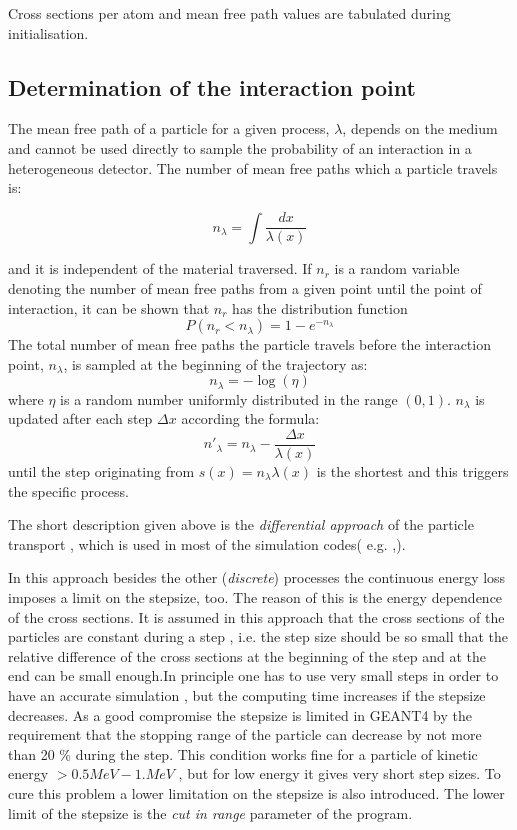 \noindent
Cross sections per atom and mean free path values are tabulated during 
initialisation.

\subsection{Determination of the interaction point}
The mean free path of a particle for a given process,
$\lambda$, depends on the medium and cannot be used
directly to sample the probability of an interaction in a heterogeneous
detector. The number of mean free paths which a particle travels is:

\begin{equation}
\label{int.c}
n_\lambda =\int \frac{dx}{\lambda(x)}
\end{equation}

and it is independent of the material traversed. If $n_r$ is
a random variable denoting the number of mean free paths from a given
point until the point of interaction, it can be shown that $n_r$ has the
distribution function
\begin{equation}
\label{int.d}
P( n_r < n_\lambda ) = 1-e^{-n_\lambda}
\end{equation}
The total number of mean free paths the particle travels before
the interaction point, $n_\lambda$, is sampled at the beginning
of the trajectory as:
\begin{equation} 
\label{int.e}
n_\lambda = -\log \left ( \eta \right )
\end{equation}   
where $\eta$ is a random number uniformly distributed
in the range $(0,1)$.
$n_\lambda$ is updated after each step $\Delta x$ according the formula:
\begin{equation}
\label{int.f}
n'_\lambda=n_\lambda -\frac{\Delta x }{\lambda(x)}
\end{equation}
until the step originating from $s(x) = n_\lambda \lambda(x)$ is
the shortest and this triggers the specific process.

The short description given above is the {\em differential approach} 
 of the particle transport , which is used in most of the simulation
codes( e.g. \cite{int.geant3},\cite{int.egs4}).

 In this approach besides the other ({\em discrete}) processes  
 the continuous energy loss imposes a limit on the stepsize, too.
 The reason of this is the
energy dependence of the cross sections. It is assumed in this approach
that
the cross sections of the particles are  constant during a step , i.e.
 the step size should be so small that the relative difference of the cross 
 sections
at the beginning of the step and at the end can be small enough.In principle
one
has to use very small steps in order to have an accurate simulation , but the 
computing
time increases if the stepsize decreases. As a good compromise the stepsize is
limited in GEANT4 by the requirement that the stopping range of the particle can
decrease by not more than 20 \% during the step. This condition works fine for
a particle of kinetic energy \(> 0.5 MeV - 1. MeV\) , but for low energy it
gives very short step sizes.
 To cure this problem a lower limitation on the stepsize is also introduced.
The lower limit of the stepsize is
 the {\em cut in range} parameter of the program. 

